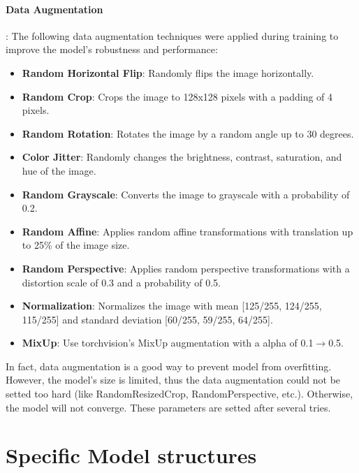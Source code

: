\documentclass[a4 paper,12pt]{article}
\theoremstyle{definitionstyle}
\begin{document}
\paragraph{Data Augmentation}:
The following data augmentation techniques were applied during training to improve the model's robustness and performance:
\begin{itemize}
    \item \textbf{Random Horizontal Flip}: Randomly flips the image horizontally.
    \item \textbf{Random Crop}: Crops the image to 128x128 pixels with a padding of 4 pixels.
    \item \textbf{Random Rotation}: Rotates the image by a random angle up to 30 degrees.
    \item \textbf{Color Jitter}: Randomly changes the brightness, contrast, saturation, and hue of the image.
    \item \textbf{Random Grayscale}: Converts the image to grayscale with a probability of 0.2.
    \item \textbf{Random Affine}: Applies random affine transformations with translation up to 25\% of the image size.
    \item \textbf{Random Perspective}: Applies random perspective transformations with a distortion scale of 0.3 and a probability of 0.5.
    \item \textbf{Normalization}: Normalizes the image with mean [125/255, 124/255, 115/255] and standard deviation [60/255, 59/255, 64/255].
    \item \textbf{MixUp}: Use torchvision's MixUp augmentation with a alpha of 0.1$\to$0.5.
\end{itemize}
In fact, data augmentation is a good way to prevent model from overfitting. However, the model's size is limited, thus the data augmentation could not be setted too hard (like RandomResizedCrop, RandomPerspective, etc.). Otherwise, the model will not converge. These parameters are setted after several tries.
\section*{Specific Model structures}
\end{document}
